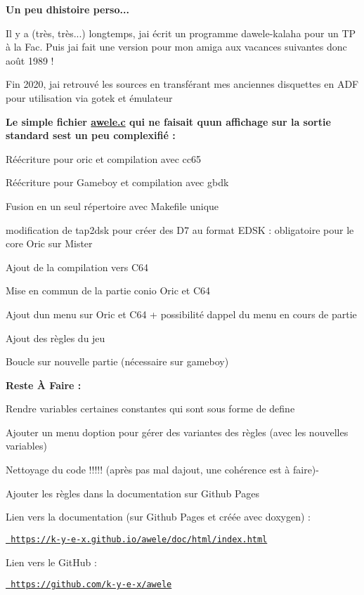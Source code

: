 \label{index_md_README}%
%
 {\bfseries{Un peu d\textquotesingle{}histoire perso...}}

Il y a (très, très...) longtemps, j\textquotesingle{}ai écrit un programme d\textquotesingle{}awele-\/kalaha pour un TP à la Fac. Puis j\textquotesingle{}ai fait une version pour mon amiga aux vacances suivantes donc août 1989 !

Fin 2020, j\textquotesingle{}ai retrouvé les sources en transférant mes anciennes disquettes en ADF pour utilisation via gotek et émulateur

{\bfseries{Le simple fichier \mbox{\hyperlink{awele_8c}{awele.\+c}} qui ne faisait qu\textquotesingle{}un affichage sur la sortie standard s\textquotesingle{}est un peu complexifié \+:}}
\begin{DoxyItemize}
\item Réécriture pour oric et compilation avec cc65
\item Réécriture pour Gameboy et compilation avec gbdk
\item Fusion en un seul répertoire avec Makefile unique
\item modification de tap2dsk pour créer des D7 au format EDSK \+: obligatoire pour le core Oric sur Mister
\item Ajout de la compilation vers C64
\item Mise en commun de la partie conio Oric et C64
\item Ajout d\textquotesingle{}un menu sur Oric et C64 + possibilité d\textquotesingle{}appel du menu en cours de partie
\item Ajout des règles du jeu
\item Boucle sur nouvelle partie (nécessaire sur gameboy)
\end{DoxyItemize}

{\bfseries{Reste À Faire \+:}}
\begin{DoxyItemize}
\item Rendre variables certaines constantes qui sont sous forme de define
\item Ajouter un menu d\textquotesingle{}option pour gérer des variantes des règles (avec les nouvelles variables)
\item Nettoyage du code !!!!! (après pas mal d\textquotesingle{}ajout, une cohérence est à faire)-\/
\item Ajouter les règles dans la documentation sur Github Pages
\end{DoxyItemize}

Lien vers la documentation (sur Github Pages et créée avec doxygen) \+: ~\newline


\href{https://k-y-e-x.github.io/awele/doc/html/index.html}{\texttt{ https\+://k-\/y-\/e-\/x.\+github.\+io/awele/doc/html/index.\+html}}

Lien vers le Git\+Hub \+: ~\newline


\href{https://github.com/k-y-e-x/awele}{\texttt{ https\+://github.\+com/k-\/y-\/e-\/x/awele}} 